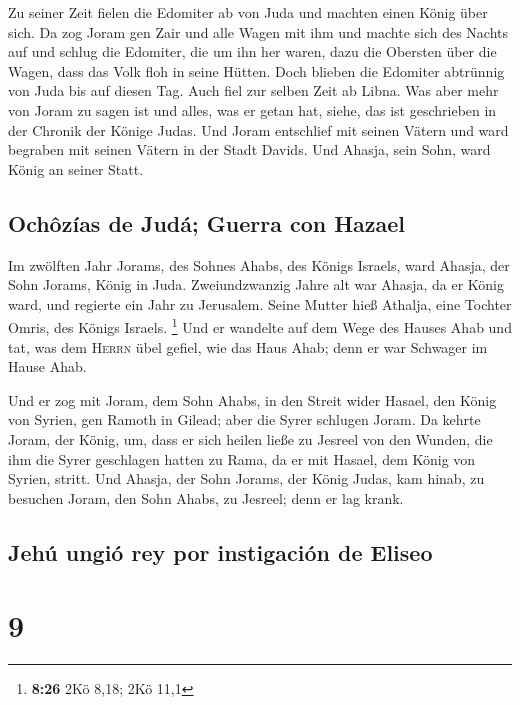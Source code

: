  Zu seiner Zeit fielen die Edomiter ab von Juda und
machten einen König über sich.  Da zog Joram gen Zair und
alle Wagen mit ihm und machte sich des Nachts auf und schlug die
Edomiter, die um ihn her waren, dazu die Obersten über die Wagen, dass
das Volk floh in seine Hütten.  Doch blieben die Edomiter
abtrünnig von Juda bis auf diesen Tag. Auch fiel zur selben Zeit ab
Libna.  Was aber mehr von Joram zu sagen ist und alles,
was er getan hat, siehe, das ist geschrieben in der Chronik der Könige
Judas.  Und Joram entschlief mit seinen Vätern und ward
begraben mit seinen Vätern in der Stadt Davids. Und Ahasja, sein Sohn,
ward König an seiner Statt.

\hypertarget{ochuxf4zuxedas-de-juduxe1-guerra-con-hazael}{%
\subsection{Ochôzías de Judá; Guerra con
Hazael}\label{ochuxf4zuxedas-de-juduxe1-guerra-con-hazael}}

 Im zwölften Jahr Jorams, des Sohnes Ahabs, des Königs
Israels, ward Ahasja, der Sohn Jorams, König in Juda. 
Zweiundzwanzig Jahre alt war Ahasja, da er König ward, und regierte ein
Jahr zu Jerusalem. Seine Mutter hieß Athalja, eine Tochter Omris, des
Königs Israels. \footnote{\textbf{8:26} 2Kö 8,18; 2Kö 11,1}
 Und er wandelte auf dem Wege des Hauses Ahab und tat,
was dem \textsc{Herrn} übel gefiel, wie das Haus Ahab; denn er war
Schwager im Hause Ahab.

 Und er zog mit Joram, dem Sohn Ahabs, in den Streit
wider Hasael, den König von Syrien, gen Ramoth in Gilead; aber die Syrer
schlugen Joram.  Da kehrte Joram, der König, um, dass er
sich heilen ließe zu Jesreel von den Wunden, die ihm die Syrer
geschlagen hatten zu Rama, da er mit Hasael, dem König von Syrien,
stritt. Und Ahasja, der Sohn Jorams, der König Judas, kam hinab, zu
besuchen Joram, den Sohn Ahabs, zu Jesreel; denn er lag krank.

\hypertarget{jehuxfa-ungiuxf3-rey-por-instigaciuxf3n-de-eliseo}{%
\subsection{Jehú ungió rey por instigación de
Eliseo}\label{jehuxfa-ungiuxf3-rey-por-instigaciuxf3n-de-eliseo}}

\hypertarget{section-8}{%
\section{9}\label{section-8}}

